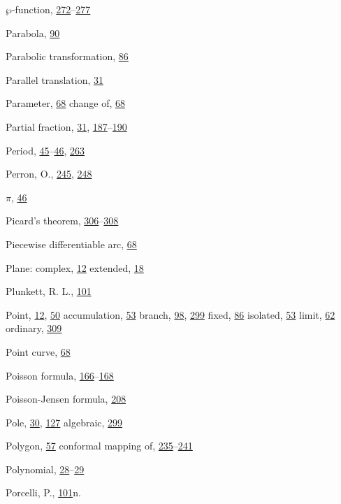 \begin{theindex}
\item $\wp$-function, \hyperlink{orig-p272}{272}--\hyperlink{orig-p277}{277}
\item Parabola, \hyperlink{orig-p90}{90}
\item Parabolic transformation, \hyperlink{orig-p86}{86}
\item Parallel translation, \hyperlink{orig-p31}{31}
\item Parameter, \hyperlink{orig-p68}{68}
\subitem change of, \hyperlink{orig-p68}{68}
\item Partial fraction, \hyperlink{orig-p31}{31}, \hyperlink{orig-p187}{187}--\hyperlink{orig-p190}{190}
\item Period, \hyperlink{orig-p45}{45}--\hyperlink{orig-p46}{46}, \hyperlink{orig-p263}{263}
\item Perron, O., \hyperlink{orig-p245}{245}, \hyperlink{orig-p248}{248}
\item $\pi$, \hyperlink{orig-p46}{46}
\item Picard's theorem, \hyperlink{orig-p306}{306}--\hyperlink{orig-p308}{308}
\item Piecewise differentiable arc, \hyperlink{orig-p68}{68}
\item Plane:
\subitem complex, \hyperlink{orig-p12}{12}
\subitem extended, \hyperlink{orig-p18}{18}
\item Plunkett, R. L., \hyperlink{orig-p101}{101}
\item Point, \hyperlink{orig-p12}{12}, \hyperlink{orig-p50}{50}
\subitem accumulation, \hyperlink{orig-p53}{53}
\subitem branch, \hyperlink{orig-p98}{98}, \hyperlink{orig-p299}{299}
\subitem fixed, \hyperlink{orig-p86}{86}
\subitem isolated, \hyperlink{orig-p53}{53}
\subitem limit, \hyperlink{orig-p62}{62}
\subitem ordinary, \hyperlink{orig-p309}{309}
\item Point curve, \hyperlink{orig-p68}{68}
\item Poisson formula, \hyperlink{orig-p166}{166}--\hyperlink{orig-p168}{168}
\item Poisson-Jensen formula, \hyperlink{orig-p208}{208}
\item Pole, \hyperlink{orig-p30}{30}, \hyperlink{orig-p127}{127}
\subitem algebraic, \hyperlink{orig-p299}{299}
\item Polygon, \hyperlink{orig-p57}{57}
\subitem conformal mapping of, \hyperlink{orig-p235}{235}--\hyperlink{orig-p241}{241}
\item Polynomial, \hyperlink{orig-p28}{28}--\hyperlink{orig-p29}{29}
\item Porcelli, P., \hyperlink{orig-p101}{101}n.

\end{theindex}
